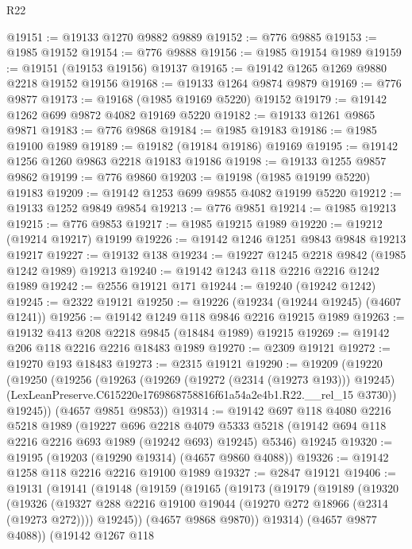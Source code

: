 \begin{lexlean}{R22}
\begin{coremodule}
@19151 := @19133 @1270 @9882 @9889
@19152 := @776 @9885
@19153 := @1985 @19152
@19154 := @776 @9888
@19156 := @1985 @19154 @1989
@19159 := @19151 (@19153 @19156) @19137
@19165 := @19142 @1265 @1269 @9880 @2218 @19152 @19156
@19168 := @19133 @1264 @9874 @9879
@19169 := @776 @9877
@19173 := @19168 (@1985 @19169 @5220) @19152
@19179 := @19142 @1262 @699 @9872 @4082 @19169 @5220
@19182 := @19133 @1261 @9865 @9871
@19183 := @776 @9868
@19184 := @1985 @19183
@19186 := @1985 @19100 @1989
@19189 := @19182 (@19184 @19186) @19169
@19195 := @19142 @1256 @1260 @9863 @2218 @19183 @19186
@19198 := @19133 @1255 @9857 @9862
@19199 := @776 @9860
@19203 := @19198 (@1985 @19199 @5220) @19183
@19209 := @19142 @1253 @699 @9855 @4082 @19199 @5220
@19212 := @19133 @1252 @9849 @9854
@19213 := @776 @9851
@19214 := @1985 @19213
@19215 := @776 @9853
@19217 := @1985 @19215 @1989
@19220 := @19212 (@19214 @19217) @19199
@19226 := @19142 @1246 @1251 @9843 @9848 @19213 @19217
@19227 := @19132 @138
@19234 := @19227 @1245 @2218 @9842 (@1985 @1242 @1989) @19213
@19240 := @19142 @1243 @118 @2216 @2216 @1242 @1989
@19242 := @2556 @19121 @171
@19244 := @19240 (@19242 @1242)
@19245 := @2322 @19121
@19250 := @19226 (@19234 (@19244 @19245) (@4607 @1241))
@19256 := @19142 @1249 @118 @9846 @2216 @19215 @1989
@19263 := @19132 @413 @208 @2218 @9845 (@18484 @1989) @19215
@19269 := @19142 @206 @118 @2216 @2216 @18483 @1989
@19270 := @2309 @19121
@19272 := @19270 @193 @18483
@19273 := @2315 @19121
@19290 := @19209
    (@19220
      (@19250
        (@19256
          (@19263
            (@19269 (@19272 (@2314 (@19273 @193))) @19245)
            (LexLeanPreserve.C615220e1769868758816f61a54a2e4b1.R22.__rel_15 @3730))
          @19245))
      (@4657 @9851 @9853))
@19314 := @19142
    @697
    @118
    @4080
    @2216
    @5218
    @1989
    (@19227
      @696
      @2218
      @4079
      @5333
      @5218
      (@19142 @694 @118 @2216 @2216 @693 @1989 (@19242 @693) @19245)
      @5346)
    @19245
@19320 := @19195 (@19203 (@19290 @19314) (@4657 @9860 @4088))
@19326 := @19142 @1258 @118 @2216 @2216 @19100 @1989
@19327 := @2847 @19121
@19406 := @19131
    (@19141
      (@19148
        (@19159
          (@19165
            (@19173
              (@19179
                (@19189
                  (@19320
                    (@19326
                      (@19327 @288 @2216 @19100 @19044 (@19270 @272 @18966 (@2314 (@19273 @272))))
                      @19245))
                  (@4657 @9868 @9870))
                @19314)
              (@4657 @9877 @4088))
            (@19142
              @1267
              @118

\end{coremodule}
\end{lexlean}
